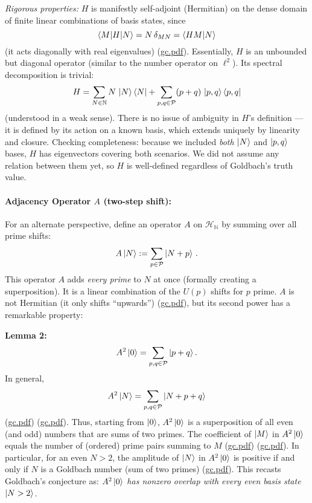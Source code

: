 \documentclass[12pt]{article}
\begin{document}
\smallskip

\textit{Rigorous properties:} $H$ is manifestly self-adjoint (Hermitian) on the dense domain of finite linear combinations of basis states, since
\[
\braket{M|H|N} = N\,\delta_{MN} = \braket{HM|N}
\]
(it acts diagonally with real eigenvalues) (\href{file://file-7ZYYwSHWVa83XEVTrEhg5z#:~:text=on%20each%20prime}{gc.pdf}). Essentially, $H$ is an unbounded but diagonal operator (similar to the number operator on $\ell^2$). Its spectral decomposition is trivial:
\[
H = \sum_{N\in\mathbb{N}} N\,\ket{N}\bra{N} + \sum_{p,q\in\mathcal{P}}(p+q)\,\ket{p,q}\bra{p,q}
\]
(understood in a weak sense). There is no issue of ambiguity in $H$’s definition --- it is defined by its action on a known basis, which extends uniquely by linearity and closure. Checking completeness: because we included \emph{both} $\ket{N}$ and $\ket{p,q}$ bases, $H$ has eigenvectors covering both scenarios. We did not assume any relation between them yet, so $H$ is well-defined regardless of Goldbach’s truth value.

\paragraph{Adjacency Operator $A$ (two-step shift):}
For an alternate perspective, define an operator $A$ on $\mathcal{H}_{\mathbb{N}}$ by summing over all prime shifts:
\[
A\ket{N} := \sum_{p\in\mathcal{P}} \ket{N+p}\,.
\]
This operator $A$ adds \emph{every prime} to $N$ at once (formally creating a superposition). It is a linear combination of the $U(p)$ shifts for $p$ prime. $A$ is not Hermitian (it only shifts “upwards”) (\href{file://file-7ZYYwSHWVa83XEVTrEhg5z#:~:text=encapsulates%20the%20arithmetic%20progression%20by,p%24%20is%20ignored%20if%20negative}{gc.pdf}), but its second power has a remarkable property:

\bigskip

\textbf{Lemma 2:} 
\[
A^2\ket{0} = \sum_{p,q\in\mathcal{P}} \ket{p+q}.
\]
In general,
\[
A^2\ket{N} = \sum_{p,q\in\mathcal{P}} \ket{N+p+q}
\]
(\href{file://file-7ZYYwSHWVa83XEVTrEhg5z#:~:text=Lemma%203%20%28Two,equals%20the%20number%20of}{gc.pdf}) (\href{file://file-7ZYYwSHWVa83XEVTrEhg5z#:~:text=Proof%3A%20The%20operator%20multiplication%20gives,number%20of%20ways%20to%20write}{gc.pdf}). Thus, starting from $\ket{0}$, $A^2\ket{0}$ is a superposition of all even (and odd) numbers that are sums of two primes. The coefficient of $\ket{M}$ in $A^2\ket{0}$ equals the number of (ordered) prime pairs summing to $M$ (\href{file://file-7ZYYwSHWVa83XEVTrEhg5z#:~:text=particular%2C%20starting%20from%20%24%7C0%5Crangle%24%2C%20A2%E2%88%A30%E2%9F%A9%E2%80%85%E2%80%8A%3D%E2%80%85%E2%80%8A%E2%88%91p%2Cq%E2%88%88P%E2%88%A3p%2Bq%E2%9F%A9%E2%80%89%2CA}{gc.pdf}) (\href{file://file-7ZYYwSHWVa83XEVTrEhg5z#:~:text=front%20of%20%24%7CM%5Crangle%24%20in%20%24A,the%20sum%20of%20two%20primes}{gc.pdf}). In particular, for an even $N>2$, the amplitude of $\ket{N}$ in $A^2\ket{0}$ is positive if and only if $N$ is a Goldbach number (sum of two primes) (\href{file://file-7ZYYwSHWVa83XEVTrEhg5z#:~:text=%5Cmathcal,the%20sum%20of%20two%20primes}{gc.pdf}). This recasts Goldbach’s conjecture as: \textit{$A^2\ket{0}$ has nonzero overlap with every even basis state $\ket{N>2}$.}
\end{document}
